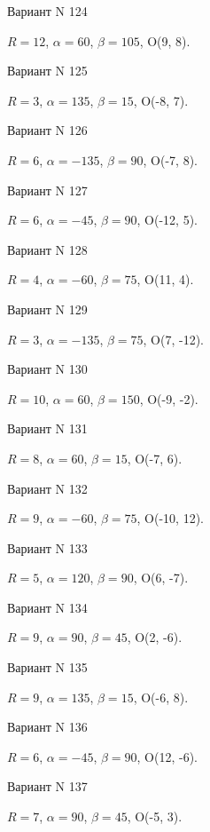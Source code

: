 \documentclass[11pt]{report}
\begin{document}
Вариант N 124

$R = 12$, $\alpha = 60$, $\beta = 105$, O(9, 8).



Вариант N 125

$R = 3$, $\alpha = 135$, $\beta = 15$, O(-8, 7).



Вариант N 126

$R = 6$, $\alpha = -135$, $\beta = 90$, O(-7, 8).



Вариант N 127

$R = 6$, $\alpha = -45$, $\beta = 90$, O(-12, 5).



Вариант N 128

$R = 4$, $\alpha = -60$, $\beta = 75$, O(11, 4).



Вариант N 129

$R = 3$, $\alpha = -135$, $\beta = 75$, O(7, -12).



Вариант N 130

$R = 10$, $\alpha = 60$, $\beta = 150$, O(-9, -2).



Вариант N 131

$R = 8$, $\alpha = 60$, $\beta = 15$, O(-7, 6).



Вариант N 132

$R = 9$, $\alpha = -60$, $\beta = 75$, O(-10, 12).



Вариант N 133

$R = 5$, $\alpha = 120$, $\beta = 90$, O(6, -7).



Вариант N 134

$R = 9$, $\alpha = 90$, $\beta = 45$, O(2, -6).



Вариант N 135

$R = 9$, $\alpha = 135$, $\beta = 15$, O(-6, 8).



Вариант N 136

$R = 6$, $\alpha = -45$, $\beta = 90$, O(12, -6).



Вариант N 137

$R = 7$, $\alpha = 90$, $\beta = 45$, O(-5, 3).
\end{document}
